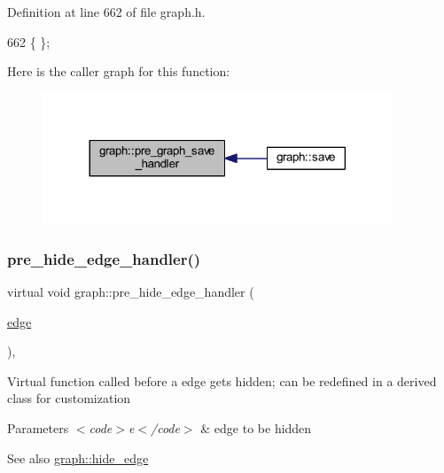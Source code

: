 Definition at line 662 of file graph.\+h.


\begin{DoxyCode}
662 \{ \};
\end{DoxyCode}
Here is the caller graph for this function\+:
\nopagebreak
\begin{figure}[H]
\begin{center}
\leavevmode
\includegraphics[width=296pt]{classgraph_ab257e02f6fd04fef244032a3a15bec9f_icgraph}
\end{center}
\end{figure}
\mbox{\label{classgraph_aa33201befa6ad7433becd7424d6de55b}} 
\subsubsection{\texorpdfstring{pre\+\_\+hide\+\_\+edge\+\_\+handler()}{pre\_hide\_edge\_handler()}}
{\footnotesize\ttfamily virtual void graph\+::pre\+\_\+hide\+\_\+edge\+\_\+handler (\begin{DoxyParamCaption}\item[{\mbox{\hyperlink{classedge}{edge}}}]{ }\end{DoxyParamCaption})\hspace{0.3cm}{\ttfamily [inline]}, {\ttfamily [virtual]}}

Virtual function called before a edge gets hidden; can be redefined in a derived class for customization


\begin{DoxyParams}{Parameters}
{\em $<$code$>$e$<$/code$>$} & edge to be hidden \\
\hline
\end{DoxyParams}
\begin{DoxySeeAlso}{See also}
\mbox{\hyperlink{classgraph_ab2f8520bcac080d73c55228fecc61825}{graph\+::hide\+\_\+edge}} 
\end{DoxySeeAlso}



